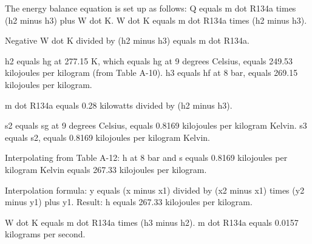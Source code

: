 The energy balance equation is set up as follows:  
Q equals m dot R134a times (h2 minus h3) plus W dot K.  
W dot K equals m dot R134a times (h2 minus h3).  

Negative W dot K divided by (h2 minus h3) equals m dot R134a.  

h2 equals hg at 277.15 K, which equals hg at 9 degrees Celsius, equals 249.53 kilojoules per kilogram (from Table A-10).  
h3 equals hf at 8 bar, equals 269.15 kilojoules per kilogram.  

m dot R134a equals 0.28 kilowatts divided by (h2 minus h3).  

s2 equals sg at 9 degrees Celsius, equals 0.8169 kilojoules per kilogram Kelvin.  
s3 equals s2, equals 0.8169 kilojoules per kilogram Kelvin.  

Interpolating from Table A-12:  
h at 8 bar and s equals 0.8169 kilojoules per kilogram Kelvin equals 267.33 kilojoules per kilogram.  

Interpolation formula:  
y equals (x minus x1) divided by (x2 minus x1) times (y2 minus y1) plus y1.  
Result: h equals 267.33 kilojoules per kilogram.  

W dot K equals m dot R134a times (h3 minus h2).  
m dot R134a equals 0.0157 kilograms per second.